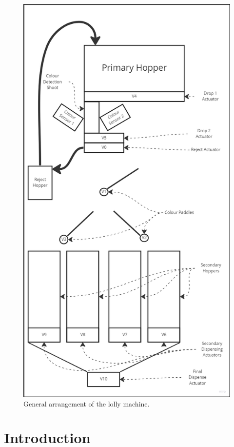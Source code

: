 

\begin{figure}[ht]
    \centering
    \includegraphics[scale = 0.3]{2_images/lollyMachineBw}
    \caption{General arrangement of the lolly machine.}
    \label{fig:lollyMachineBw}
\end{figure}

\section{Introduction}

